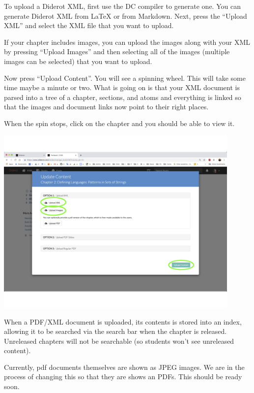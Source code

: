 \begin{gram}
\label{guide:chapter::upload-xml}
To upload a Diderot XML, first use the DC compiler to generate one.  You can generate Diderot XML from LaTeX or from Markdown.  Next, press the ``Upload XML'' and select the XML file that you want to upload. 
%

If your chapter includes images, you can upload the images along with your XML by pressing ``Upload Images'' and then selecting all of the images (multiple images can be selected) that you want to upload.

Now press ``Upload Content''. You will see a spinning wheel.  This will take some time maybe a minute or two.  What is going on is that your XML document is parsed into a tree of a chapter, sections, and atoms and everything is linked so that the images and document links now point to their right places.

When the spin stops, click on the chapter and you should be able to
view it.

\includegraphics[width=0.9\textwidth]{staff/media/upload-xml.jpg}
\end{gram}



\begin{important}
When a PDF/XML document is uploaded, its contents is stored into an index, allowing it to be searched via the search bar when the chapter is released.
%
Unreleased chapters will not be searchable (so students won't see
unreleased content).
\end{important}

\begin{note}
Currently, pdf documents themselves are shown as JPEG images.  We are in the process of changing this so that they are shows an PDFs.  This should be ready soon.
\end{note}


